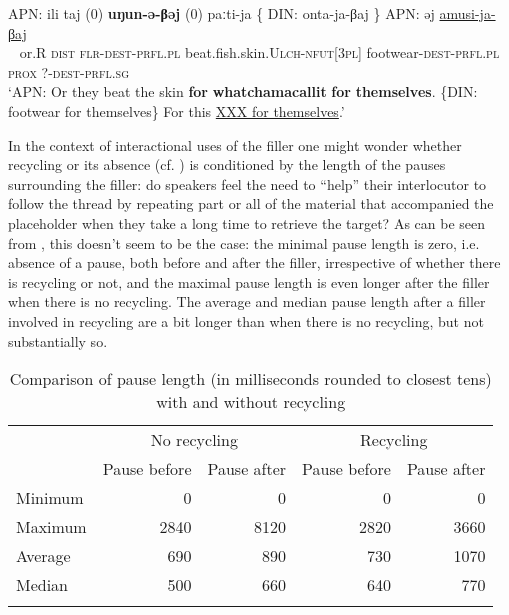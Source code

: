 \documentclass[output=paper]{langscibook}
\begin{document}
\ea \label{ex:pakendorf:59}
\gll \textup{APN:}
	ili taj
	\textup{(0)} \textbf{uŋun-ə-βəj} \textup{(0)}
	paːti-ja 
	{\textup{\{}
	\textup{DIN:}}
	onta-ja-βaj
	\textup{\}}
	\textup{APN:}
	əj \uline{amusi-ja-βaj}\\
    ~{}
    or.R \textsc{dist} 
    {} \textsc{flr-dest-prfl.pl} {}
    beat.fish.skin.\textsc{Ulch-nfut[3pl]}
    {{}
    {}}
    footwear-\textsc{dest-prfl.pl}
    {}
    {}
    \textsc{prox} \textsc{?-dest-prfl.sg}\\
\glt ‘APN: Or they beat the skin \textbf{for} \textbf{whatchamacallit} \textbf{for} \textbf{themselves}. \{DIN: footwear for themselves\} For this \uline{XXX for themselves}.’ 
\z

In the context of interactional uses of the filler one might wonder whether recycling or its absence (cf. ) is conditioned by the length of the pauses surrounding the filler: do speakers feel the need to “help” their interlocutor to follow the thread by repeating part or all of the material that accompanied the placeholder when they take a long time to retrieve the target? As can be seen from , this doesn’t seem to be the case: the minimal pause length is zero, i.e. absence of a pause, both before and after the filler, irrespective of whether there is recycling or not, and the maximal pause length is even longer after the filler when there is no recycling. The average and median pause length after a filler involved in recycling are a bit longer than when there is no recycling, but not substantially so. 

\begin{table}
\begin{tabular}{lrrrr}
\lsptoprule
 & \multicolumn{2}{c}{{No recycling}} & \multicolumn{2}{c}{{Recycling}}\\
& {Pause before} & {Pause after} & {Pause before} & {Pause after}\\
\midrule
{Minimum} &  0 &  0 &  0 &  0\\
{Maximum} &  2840 &  8120 &  2820 &  3660\\
{Average} &  690 &  890 &  730 & 1070\\
{Median} & 500 & 660 & 640 &  770\\
\lspbottomrule
\end{tabular}
\caption{Comparison of pause length (in milliseconds rounded to closest tens) with and without recycling}
\label{tab:pakendorf:3}
\end{table}
\end{document}
